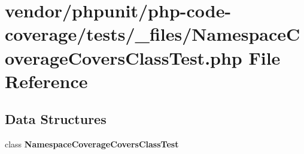\section{vendor/phpunit/php-\/code-\/coverage/tests/\+\_\+files/\+Namespace\+Coverage\+Covers\+Class\+Test.php File Reference}
\label{php-code-coverage_2tests_2__files_2_namespace_coverage_covers_class_test_8php}
\subsection*{Data Structures}
\begin{DoxyCompactItemize}
\item 
class {\bf Namespace\+Coverage\+Covers\+Class\+Test}
\end{DoxyCompactItemize}
